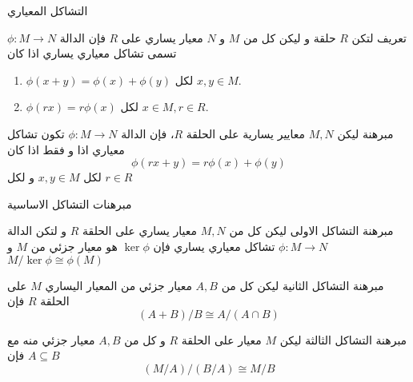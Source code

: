 \begin{frame}{التشاكل المعياري}
	
	\pause
	\begin{exampleblock}{تعريف}
		لتكن $R$ حلقة و ليكن كل من $M$ و $N$ معيار يساري على $R$ فإن الدالة $\phi:M\to N$ تسمى تشاكل معياري يساري اذا كان 
		\begin{enumerate}
			\item $\phi(x+y) = \phi(x) + \phi(y)$ لكل $x,y\in M$.
			\item $\phi(rx) = r\phi(x)$ لكل $x\in M, r\in R$.  
		\end{enumerate}
	\end{exampleblock}
	
	
	\pause
\begin{exampleblock}{مبرهنة}
	ليكن $M,N$ معايير يسارية على الحلقة $R$، فإن الدالة $\phi:M\to N$ تكون تشاكل معياري اذا و فقط اذا كان
	\[
	\phi(rx + y) = r\phi(x) + \phi(y)
	\]
	لكل $x,y\in M$ و لكل $r\in R$
\end{exampleblock}
\end{frame}


\begin{frame}{مبرهنات التشاكل الاساسية}
	
	\pause 
	\begin{exampleblock}{مبرهنة التشاكل الاولى}
		ليكن كل من $M,N$ معيار يساري على الحلقة $R$ و لتكن الدالة $\phi:M\to N$ تشاكل معياري يساري فإن $\ker \phi$ هو معيار جزئي من $M$ و $M/\ker\phi\cong \phi(M)$
	\end{exampleblock}
	
	\pause
	\begin{exampleblock}{مبرهنة التشاكل الثانية}
		ليكن كل من $A,B$ معيار جزئي من المعيار اليساري $M$ على  الحلقة $R$ فإن
		\[
		(A+B)/B\cong A/(A\cap B)
		\]
	\end{exampleblock}

	\pause
	\begin{exampleblock}{مبرهنة التشاكل الثالثة}
		ليكن $M$ معيار على الحلقة $R$ و كل من $A, B$ معيار جزئي منه مع $A\subseteq B$ فإن
		\[
		(M/A) / (B/A) \cong M/B
		\]
	\end{exampleblock}
	\end{frame}
